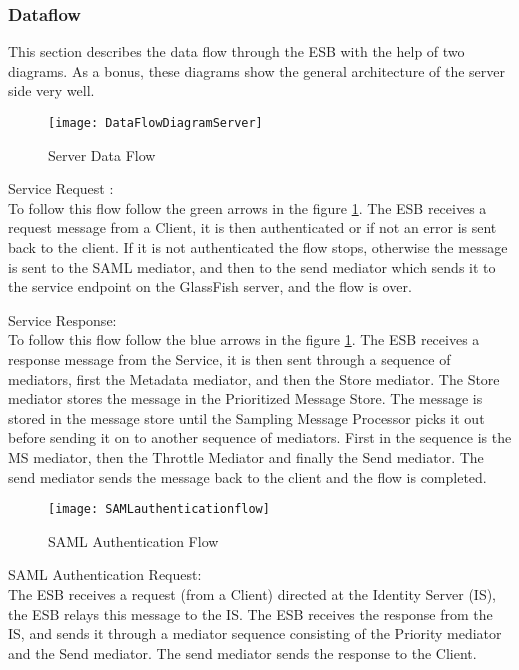     \subsubsection{Dataflow}\label{Textual Server Dataflow} 
        This section describes the data flow through the ESB with the help of two diagrams. As a bonus, these diagrams show the general architecture of the server side very well.

        \begin{figure}[h]
            \centering
            \texttt{[image: DataFlowDiagramServer]}
            \caption{Server Data Flow}
            \label{fig:DataFlowDiagramServer}
        \end{figure}

Service Request :\\
To follow this flow follow the green arrows in the figure \ref{fig:DataFlowDiagramServer}. The ESB receives a request message from a Client, it is then authenticated or if not an error is sent back to the client. If it is not authenticated the flow stops, otherwise the message is sent to the SAML mediator, and then to the send mediator which sends it to the service endpoint on the GlassFish server, and the flow is over.

Service Response:\\
To follow this flow follow the blue arrows in the figure \ref{fig:DataFlowDiagramServer}. The ESB receives a response message from the Service, it is then sent through a sequence of mediators, first the Metadata mediator, and then  the Store mediator. The Store mediator stores the message in the Prioritized Message Store. The message is stored in the message store until the Sampling Message Processor picks it out before sending it on to another sequence of mediators. First in the sequence is the MS mediator, then the Throttle Mediator and finally the Send mediator. The send mediator sends the message back to the client and the flow is completed.

    \begin{figure}[h]
        \centering
        \texttt{[image: SAMLauthenticationflow]}
        \caption{SAML Authentication Flow}
        \label{fig:SAMLauthenticationflow}
    \end{figure}
            
SAML Authentication Request:\\
The ESB receives a request (from a Client) directed at the Identity Server (IS), the ESB relays this message to the IS. The ESB receives the response from the IS, and sends it through a mediator sequence consisting of the Priority mediator and the Send mediator. The send mediator sends the response to the Client.

